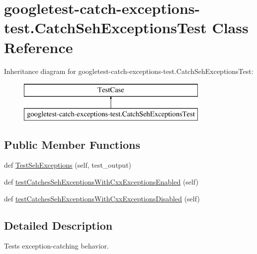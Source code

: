 \hypertarget{classgoogletest-catch-exceptions-test_1_1_catch_seh_exceptions_test}{}\section{googletest-\/catch-\/exceptions-\/test.Catch\+Seh\+Exceptions\+Test Class Reference}
\label{classgoogletest-catch-exceptions-test_1_1_catch_seh_exceptions_test}
Inheritance diagram for googletest-\/catch-\/exceptions-\/test.Catch\+Seh\+Exceptions\+Test\+:\begin{figure}[H]
\begin{center}
\leavevmode
\includegraphics[height=2.000000cm]{d5/d93/classgoogletest-catch-exceptions-test_1_1_catch_seh_exceptions_test}
\end{center}
\end{figure}
\subsection*{Public Member Functions}
\begin{DoxyCompactItemize}
\item 
def \mbox{\hyperlink{classgoogletest-catch-exceptions-test_1_1_catch_seh_exceptions_test_a86d5639a464b9ee5e05816758bd1ae1f}{Test\+Seh\+Exceptions}} (self, test\+\_\+output)
\item 
def \mbox{\hyperlink{classgoogletest-catch-exceptions-test_1_1_catch_seh_exceptions_test_abfb6b8448b7af79621f6f663e40ebca3}{test\+Catches\+Seh\+Exceptions\+With\+Cxx\+Exceptions\+Enabled}} (self)
\item 
def \mbox{\hyperlink{classgoogletest-catch-exceptions-test_1_1_catch_seh_exceptions_test_a8e448244058ea16b0ba3148678c0b9e6}{test\+Catches\+Seh\+Exceptions\+With\+Cxx\+Exceptions\+Disabled}} (self)
\end{DoxyCompactItemize}


\subsection{Detailed Description}
\begin{DoxyVerb}Tests exception-catching behavior.\end{DoxyVerb}
 

